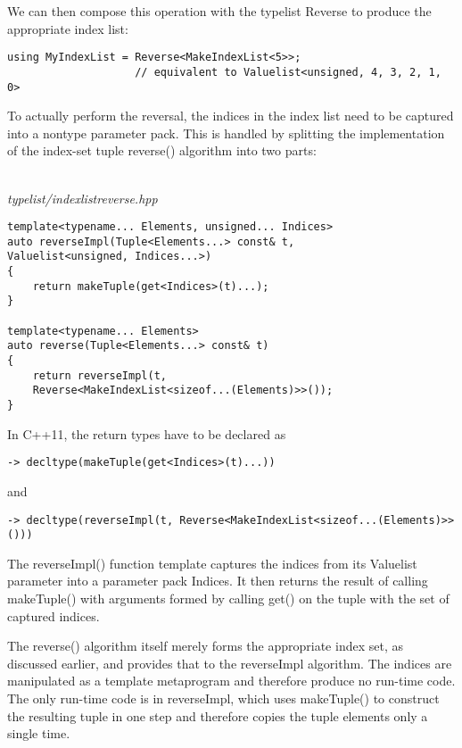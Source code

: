 We can then compose this operation with the typelist Reverse to produce the appropriate index list:

\begin{lstlisting}[style=styleCXX]
using MyIndexList = Reverse<MakeIndexList<5>>;
					// equivalent to Valuelist<unsigned, 4, 3, 2, 1, 0>
\end{lstlisting}

To actually perform the reversal, the indices in the index list need to be captured into a nontype parameter pack. This is handled by splitting the implementation of the index-set tuple reverse() algorithm into two parts:

\hspace*{\fill} \\ %
\noindent
\textit{typelist/indexlistreverse.hpp}
\begin{lstlisting}[style=styleCXX]
template<typename... Elements, unsigned... Indices>
auto reverseImpl(Tuple<Elements...> const& t,
Valuelist<unsigned, Indices...>)
{
	return makeTuple(get<Indices>(t)...);
}

template<typename... Elements>
auto reverse(Tuple<Elements...> const& t)
{
	return reverseImpl(t,
	Reverse<MakeIndexList<sizeof...(Elements)>>());
}
\end{lstlisting}

In C++11, the return types have to be declared as

\begin{lstlisting}[style=styleCXX]
-> decltype(makeTuple(get<Indices>(t)...))
\end{lstlisting}

and

\begin{lstlisting}[style=styleCXX]
-> decltype(reverseImpl(t, Reverse<MakeIndexList<sizeof...(Elements)>>()))
\end{lstlisting}

The reverseImpl() function template captures the indices from its Valuelist parameter into a parameter pack Indices. It then returns the result of calling makeTuple() with arguments formed by calling get() on the tuple with the set of captured indices.

The reverse() algorithm itself merely forms the appropriate index set, as discussed earlier, and provides that to the reverseImpl algorithm. The indices are manipulated as a template metaprogram and therefore produce no run-time code. The only run-time code is in reverseImpl, which uses makeTuple() to construct the resulting tuple in one step and therefore copies the tuple elements only a single time.

